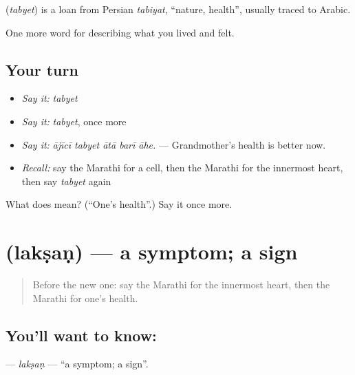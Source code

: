 \begin{cousinweb}
\textbf{} (\emph{tabyet}) is a loan from Persian \emph{tabiyat}, \textquotedblleft{}nature, health\textquotedblright{}, usually traced to Arabic.
\end{cousinweb}

\begin{grammarlens}[title={What you've built}]
One more word for describing what you lived and felt.
\end{grammarlens}

\subsection*{Your turn}
\begin{itemize}
\raggedright
  \item \emph{Say it:} \emph{tabyet}
  \item \emph{Say it:} \emph{tabyet}, once more
  \item \emph{Say it:} \emph{ājīcī tabyet ātā barī āhe.} — Grandmother's health is better now.
  \item \emph{Recall:} say the Marathi for a cell, then the Marathi for the innermost heart, then say \emph{tabyet} again
\end{itemize}

\begin{tcolorbox}[breakable,colback=teal!4,colframe=teal!35!black,title={Before you move on}]
What does  mean? (\textquotedblleft{}One's health\textquotedblright{}.) Say it once more.
\end{tcolorbox}
\section[\texorpdfstring{\mr{लक्षण} (lakṣaṇ)}{लक्षण (lakṣaṇ)}]{ (lakṣaṇ) — a symptom; a sign}

\label{lesson:MR-C480-laksan}



\begin{quote}
Before the new one: say the Marathi for the innermost heart, then the Marathi for one's health.
\end{quote}

\subsection*{You'll want to know: }
\textbf{} — \emph{lakṣaṇ} — \textquotedblleft{}a symptom; a sign\textquotedblright{}.


